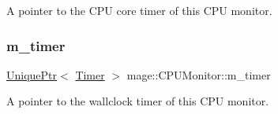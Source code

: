 A pointer to the C\+PU core timer of this C\+PU monitor. \hypertarget{classmage_1_1_c_p_u_monitor_a5d24b6b9d684a6d0c34175052a8ac850}{}\label{classmage_1_1_c_p_u_monitor_a5d24b6b9d684a6d0c34175052a8ac850} 
\subsubsection{\texorpdfstring{m\+\_\+timer}{m\_timer}}
{\footnotesize\ttfamily \hyperlink{namespacemage_a8c307fbcc33bce9b7f2aa4c26c3b95cf}{Unique\+Ptr}$<$ \hyperlink{classmage_1_1_timer}{Timer} $>$ mage\+::\+C\+P\+U\+Monitor\+::m\+\_\+timer\hspace{0.3cm}{\ttfamily [private]}}

A pointer to the wallclock timer of this C\+PU monitor. 